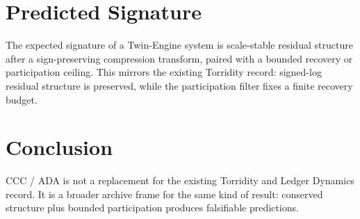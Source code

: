 \documentclass[11pt]{article}
\begin{document}
\section{Predicted Signature}
The expected signature of a Twin-Engine system is scale-stable residual structure after a sign-preserving compression transform, paired with a bounded recovery or participation ceiling. This mirrors the existing Torridity record: signed-log residual structure is preserved, while the participation filter fixes a finite recovery budget.

\section{Conclusion}
CCC / ADA is not a replacement for the existing Torridity and Ledger Dynamics record. It is a broader archive frame for the same kind of result: conserved structure plus bounded participation produces falsifiable predictions.
\end{document}
